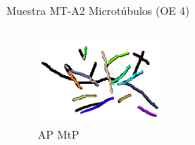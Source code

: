 \begin{frame}{Muestra MT-A2 Microt\'ubulos (OE 4)}
\begin{columns}
        \begin{column}{0.22\textwidth}
            \begin{figure}
                \centering
                \includegraphics[height=1.1in]{Pictures/Slice6-Spinning-PL-gtruth-preSkel-BW-littleClean-phil-s8192-v05-exactMatch-no-label-ants.png}
                \caption{AP MtP}
            \end{figure}
        \end{column}
    \end{columns}

    \begin{table}[h]
    \caption{Grafo de 39 aristas}
    \end{table}
\end{frame}


